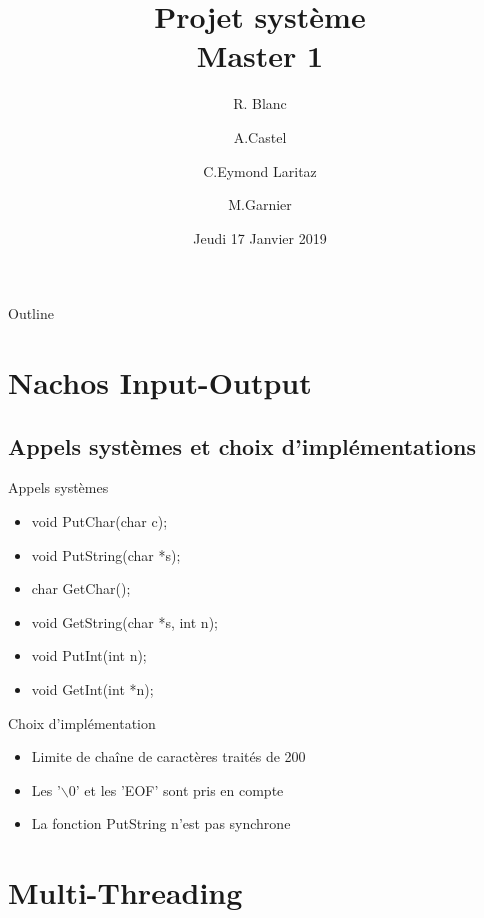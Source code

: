 \documentclass{beamer}
\title{Projet système\\Master 1}
\author{R. Blanc \and A.Castel \and C.Eymond Laritaz \and M.Garnier}
\institute[Université Grenoble Alpes] %
{
  UFR IM²AG\\
  Université Grenoble Alpes
}
\date{Jeudi 17 Janvier 2019}
\begin{document}
\begin{frame}
  \titlepage
\end{frame}

\begin{frame}{Outline}
  \tableofcontents%
\end{frame}


\section{Nachos Input-Output}
\subsection{Appels systèmes et choix d'implémentations }
\begin{frame}
	\begin{block}{Appels systèmes}
		\begin{itemize}
			\item void PutChar(char c);
			\item void PutString(char *s);
			\item char GetChar();
			\item void GetString(char *s, int n);
			\item void PutInt(int n);
			\item void GetInt(int *n);
		\end{itemize}
	\end{block}
	\begin{block}{Choix d’implémentation}
		\begin{itemize}
			\item Limite de chaîne de caractères traités de 200
			\item Les '$\backslash$0' et les 'EOF' sont pris en compte
			\item La fonction PutString n'est pas synchrone 
		\end{itemize}		
	\end{block}
\end{frame}







\section{Multi-Threading}
\end{document}
